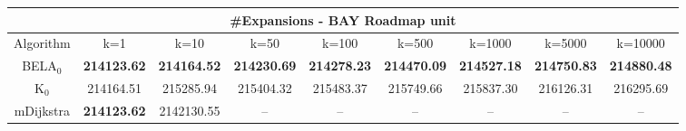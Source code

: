 \begin{tabular}{c|cccccccc}\toprule
\multicolumn{9}{c}{#Expansions - BAY Roadmap unit}\\ \midrule
Algorithm & k=1 & k=10 & k=50 & k=100 & k=500 & k=1000 & k=5000 & k=10000 \\ \midrule
BELA$_0$ & \textbf{214123.62} & \textbf{214164.52} & \textbf{214230.69} & \textbf{214278.23} & \textbf{214470.09} & \textbf{214527.18} & \textbf{214750.83} & \textbf{214880.48} \\
K$_0$ & 214164.51 & 215285.94 & 215404.32 & 215483.37 & 215749.66 & 215837.30 & 216126.31 & 216295.69 \\
mDijkstra & \textbf{214123.62} & 2142130.55 & -- & -- & -- & -- & -- & -- \\ \bottomrule 
\end{tabular}
